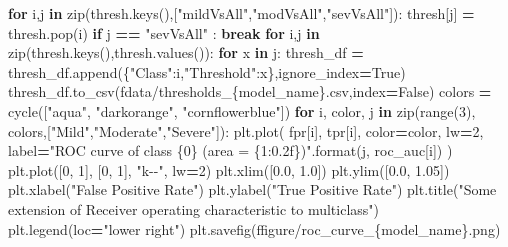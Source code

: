 \documentclass[12pt,twoside]{deuthesis}
\newenvironment{Shaded}{\begin{snugshade}}{\end{snugshade}}
\newcommand{\BuiltInTok}[1]{#1}
\newcommand{\ControlFlowTok}[1]{\textcolor[rgb]{0.13,0.29,0.53}{\textbf{#1}}}
\newcommand{\DecValTok}[1]{\textcolor[rgb]{0.00,0.00,0.81}{#1}}
\newcommand{\FloatTok}[1]{\textcolor[rgb]{0.00,0.00,0.81}{#1}}
\newcommand{\KeywordTok}[1]{\textcolor[rgb]{0.13,0.29,0.53}{\textbf{#1}}}
\newcommand{\NormalTok}[1]{#1}
\newcommand{\OperatorTok}[1]{\textcolor[rgb]{0.81,0.36,0.00}{\textbf{#1}}}
\newcommand{\SpecialCharTok}[1]{\textcolor[rgb]{0.00,0.00,0.00}{#1}}
\newcommand{\SpecialStringTok}[1]{\textcolor[rgb]{0.31,0.60,0.02}{#1}}
\newcommand{\StringTok}[1]{\textcolor[rgb]{0.31,0.60,0.02}{#1}}
\newcommand{\VariableTok}[1]{\textcolor[rgb]{0.00,0.00,0.00}{#1}}
\begin{document}
\begin{Shaded}
\begin{Highlighting}[]
    \ControlFlowTok{for}\NormalTok{ i,j }\KeywordTok{in} \BuiltInTok{zip}\NormalTok{(thresh.keys(),[}\StringTok{"mildVsAll"}\NormalTok{,}\StringTok{"modVsAll"}\NormalTok{,}\StringTok{"sevVsAll"}\NormalTok{]):}
\NormalTok{        thresh[j] }\OperatorTok{=}\NormalTok{ thresh.pop(i)}
        \ControlFlowTok{if}\NormalTok{ j }\OperatorTok{==} \StringTok{"sevVsAll"}\NormalTok{ : }\ControlFlowTok{break}
    \ControlFlowTok{for}\NormalTok{ i,j }\KeywordTok{in} \BuiltInTok{zip}\NormalTok{(thresh.keys(),thresh.values()):}
        \ControlFlowTok{for}\NormalTok{ x }\KeywordTok{in}\NormalTok{ j:}
\NormalTok{            thresh\_df }\OperatorTok{=}\NormalTok{ thresh\_df.append(\{}\StringTok{"Class"}\NormalTok{:i,}\StringTok{"Threshold"}\NormalTok{:x\},ignore\_index}\OperatorTok{=}\VariableTok{True}\NormalTok{)}
\NormalTok{    thresh\_df.to\_csv(}\SpecialStringTok{f\textquotesingle{}data/thresholds\_}\SpecialCharTok{\{}\NormalTok{model\_name}\SpecialCharTok{\}}\SpecialStringTok{.csv\textquotesingle{}}\NormalTok{,index}\OperatorTok{=}\VariableTok{False}\NormalTok{)}
\NormalTok{    colors }\OperatorTok{=}\NormalTok{ cycle([}\StringTok{"aqua"}\NormalTok{, }\StringTok{"darkorange"}\NormalTok{, }\StringTok{"cornflowerblue"}\NormalTok{])}
    \ControlFlowTok{for}\NormalTok{ i, color, j }\KeywordTok{in} \BuiltInTok{zip}\NormalTok{(}\BuiltInTok{range}\NormalTok{(}\DecValTok{3}\NormalTok{), colors,[}\StringTok{"Mild"}\NormalTok{,}\StringTok{"Moderate"}\NormalTok{,}\StringTok{"Severe"}\NormalTok{]):}
\NormalTok{        plt.plot(}
\NormalTok{            fpr[i],}
\NormalTok{            tpr[i],}
\NormalTok{            color}\OperatorTok{=}\NormalTok{color,}
\NormalTok{            lw}\OperatorTok{=}\DecValTok{2}\NormalTok{,}
\NormalTok{            label}\OperatorTok{=}\StringTok{"ROC curve of class }\SpecialCharTok{\{0\}}\StringTok{ (area = }\SpecialCharTok{\{1:0.2f\}}\StringTok{)"}\NormalTok{.}\BuiltInTok{format}\NormalTok{(j, roc\_auc[i])}
\NormalTok{        )}
\NormalTok{    plt.plot([}\DecValTok{0}\NormalTok{, }\DecValTok{1}\NormalTok{], [}\DecValTok{0}\NormalTok{, }\DecValTok{1}\NormalTok{], }\StringTok{"k{-}{-}"}\NormalTok{, lw}\OperatorTok{=}\DecValTok{2}\NormalTok{)}
\NormalTok{    plt.xlim([}\FloatTok{0.0}\NormalTok{, }\FloatTok{1.0}\NormalTok{])}
\NormalTok{    plt.ylim([}\FloatTok{0.0}\NormalTok{, }\FloatTok{1.05}\NormalTok{])}
\NormalTok{    plt.xlabel(}\StringTok{"False Positive Rate"}\NormalTok{)}
\NormalTok{    plt.ylabel(}\StringTok{"True Positive Rate"}\NormalTok{)}
\NormalTok{    plt.title(}\StringTok{"Some extension of Receiver operating characteristic to multiclass"}\NormalTok{)}
\NormalTok{    plt.legend(loc}\OperatorTok{=}\StringTok{"lower right"}\NormalTok{)}
\NormalTok{    plt.savefig(}\SpecialStringTok{f\textquotesingle{}figure/roc\_curve\_}\SpecialCharTok{\{}\NormalTok{model\_name}\SpecialCharTok{\}}\SpecialStringTok{.png\textquotesingle{}}\NormalTok{)}
\end{Highlighting}
\end{Shaded}
\end{document}
